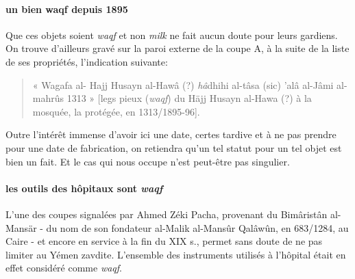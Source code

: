  

\paragraph{un bien waqf depuis 1895}
Que ces objets soient \textit{waqf} et non \textit{milk} ne fait aucun doute pour leurs gardiens. On trouve d'ailleurs gravé sur la paroi externe de la coupe A, à la suite de la liste de ses propriétés, l'indication suivante: 
\begin{quote}
    « Wagafa al-
Hajj Husayn al-Hawâ (?) \textit{hâ}dhihi al-tâsa (sic) 'alâ al-Jâmi al-mahrûs
1313 » [legs pieux (\textit{waqf}) du Häjj Husayn al-Hawa (?) à la mosquée, la protégée, en 1313/1895-96]. 
\end{quote}
Outre l'intérêt immense d'avoir ici une date, certes tardive et à ne pas prendre pour une date de fabrication, on retiendra qu'un tel statut pour un tel objet est bien un fait. Et le cas qui nous occupe n'est peut-être pas singulier. 

\paragraph{les outils des hôpitaux sont \textit{waqf}} L'une des coupes signalées par
Ahmed Zéki Pacha, provenant du Bimâristân al-Mansär - du nom de son
fondateur al-Malik al-Mansûr Qalâwûn, en 683/1284, au Caire - et encore en service à la fin du XIX s., permet sans doute de ne pas limiter
au Yémen zavdite. L'ensemble des instruments utilisés à l'hôpital était en effet considéré comme \textit{waqf}. 
